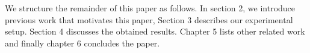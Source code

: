 \documentclass[10pt,sigconf]{acmart}
\newcommand{\todo}[1]{\textbf{\textcolor{red}{To do: #1}}}
\begin{document}

We structure the remainder of this paper as follows. In section 2, we introduce previous work that motivates this paper, Section 3 describes our experimental setup. Section 4 discusses the obtained results. Chapter 5 lists other related work and finally chapter 6 concludes the paper.















\end{document}
